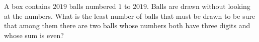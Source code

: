 A box contains $2019$ balls numbered $1$ to $2019$. Balls are drawn without looking at the numbers. What is the least number of balls that must be drawn to be sure that among them there are two balls whose numbers both have three digits and whose sum is even?

